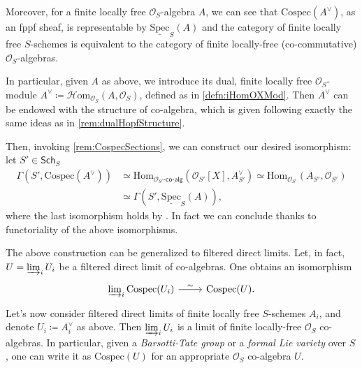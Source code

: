 \documentclass[../Main]{subfiles}
\begin{document}
\begin{rem}[]
	Moreover, for a finite locally free $\mathcal{O}_{ S }$-algebra $A$,
	we can see that $\mathrm{Cospec}(A^{\vee})$, as an fppf sheaf, is representable 
	by $\underline{\mathrm{Spec}}_S(A)$ and
	the category of finite locally free $S$-schemes
	is equivalent to the category of finite locally-free (co-commutative)
	$\mathcal{O}_{ S }$-algebras.

	In particular, given $A$ as above, we introduce its dual,
	finite locally free $\mathcal{O}_{ S }$-module 
	$A^{\vee} \coloneqq \mathcal{H}\mathrm{om}_{\mathcal{O}_{ S }} \left( A, \mathcal{O}_{ S } \right)$,
	defined as in \cref{defn:iHomOXMod}. 
	Then $A^{\vee}$ can be endowed with the structure of co-algebra, which is
	given following exactly the same ideas as in \cref{rem:dualHopfStructure}.

	Then, invoking \cref{rem:CospecSections}, we can construct 
	our desired isomorphism: let $S' \in \mathsf{Sch}_{ S }$
	\begin{align*}
		\Gamma(S', \mathrm{Cospec}(A^{\vee})) &\simeq
		\mathrm{Hom}_{ \mathcal{O}_{ S' }\text{-}\mathsf{co}\text{-}\mathsf{alg}} 
		\left( \mathcal{O}_{ S' }[X], A^\vee_{S'} \right) \simeq
		\mathrm{Hom}_{ \mathcal{O}_{ S' }}
		\left( A_{S'}, \mathcal{O}_{ S' } \right) \\
		&\simeq
		\Gamma(S', \underline{\mathrm{Spec}}_S(A))
	,\end{align*}
	where the last isomorphism holds by 
	\cite[\href{https://stacks.math.columbia.edu/tag/01LV}{Lemma 01LV}]{SP}.
	In fact we can conclude thanks to functoriality of the above isomorphisms.
\end{rem}


\begin{rem}
	The above construction can be generalized to
	filtered direct limits.
	Let, in fact, $U = \varinjlim_i U_i$ be a filtered direct limit
	of co-algebras. One obtains an isomorphism
	\begin{equation*}
	\begin{tikzcd}[row sep = 0ex
		,/tikz/column 1/.append style={anchor=base east}
		,/tikz/column 2/.append style={anchor=base west}]
		\varinjlim_i \mathrm{Cospec}(U_i) \arrow[r, "\sim", rightarrow] &
		\mathrm{Cospec}(U)
	.\end{tikzcd}
	\end{equation*} 
	Let's now consider filtered direct limits of 
	finite locally free $S$-schemes $A_i$, 
	and denote $U_i \coloneqq A_i^\vee$ as above.
	Then $\varinjlim_i U_i$ is a limit 
	of finite locally-free $\mathcal{O}_{ S }$ co-algebras.
	In particular, given a {\em Barsotti-Tate group} or a {\em formal Lie variety}
	over $S$, one can write it as $\mathrm{Cospec}(U)$ for an appropriate 
	$\mathcal{O}_{ S }$ co-algebra $U$.
\end{rem}
\end{document}
